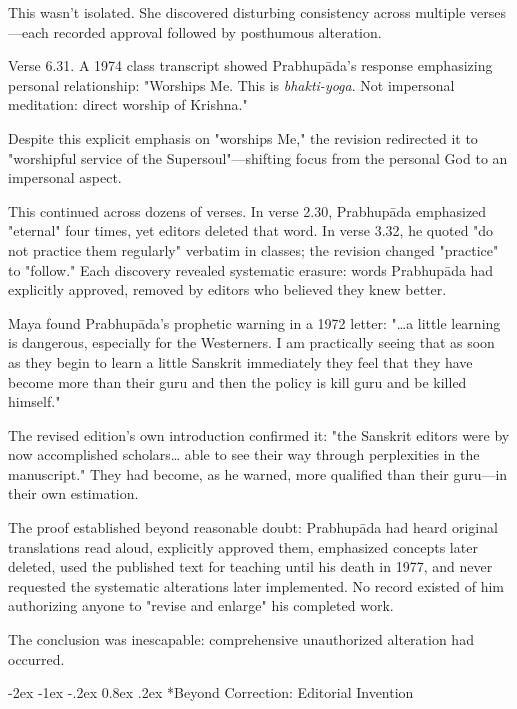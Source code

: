 \documentclass[12pt,twoside]{book}
\makeatletter
\let\oldsubsection\subsection
\renewcommand{\subsection}[1]{\needspace{3\baselineskip}\oldsubsection{#1}}
\renewcommand\subsection{\@startsection{subsection}{2}{\z@}%
{-2ex \@plus -1ex \@minus -.2ex}%
{0.8ex \@plus .2ex}%
{\normalfont\large\bfseries}}
\makeatother
\begin{document}
This wasn't isolated. She discovered disturbing consistency across multiple verses—each recorded approval followed by posthumous alteration.

Verse 6.31. A 1974 class transcript showed Prabhupāda's response emphasizing personal relationship: "Worships Me. This is \emph{bhakti-yoga}. Not impersonal meditation: direct worship of Krishna."

Despite this explicit emphasis on "worships Me," the revision redirected it to "worshipful service of the Supersoul"—shifting focus from the personal God to an impersonal aspect.

This continued across dozens of verses. In verse 2.30, Prabhupāda emphasized "eternal" four times, yet editors deleted that word. In verse 3.32, he quoted "do not practice them regularly" verbatim in classes; the revision changed "practice" to "follow." Each discovery revealed systematic erasure: words Prabhupāda had explicitly approved, removed by editors who believed they knew better.

Maya found Prabhupāda's prophetic warning in a 1972 letter: "\ldots{}a little learning is dangerous, especially for the Westerners. I am practically seeing that as soon as they begin to learn a little Sanskrit immediately they feel that they have become more than their guru and then the policy is kill guru and be killed himself."

The revised edition's own introduction confirmed it: "the Sanskrit editors were by now accomplished scholars\ldots{} able to see their way through perplexities in the manuscript." They had become, as he warned, more qualified than their guru—in their own estimation.

The proof established beyond reasonable doubt: Prabhupāda had heard original translations read aloud, explicitly approved them, emphasized concepts later deleted, used the published text for teaching until his death in 1977, and never requested the systematic alterations later implemented. No record existed of him authorizing anyone to "revise and enlarge" his completed work.

The conclusion was inescapable: comprehensive unauthorized alteration had occurred.



\vspace{0.1cm}
\subsection*{Beyond Correction: Editorial Invention}
\end{document}
